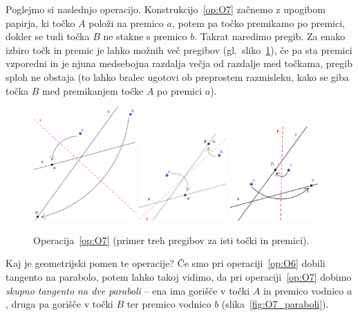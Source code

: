Poglejmo si naslednjo operacijo. Konstrukcijo~\ref{op:O7} začnemo z upogibom papirja, ki točko $A$ položi na premico $a$, potem pa točko premikamo po premici, dokler se tudi točka $B$ ne stakne s premico $b$. Takrat naredimo pregib. Za enako izbiro točk in premic je lahko možnih več pregibov (gl.\ sliko~\ref{fig:O7}), če pa sta premici vzporedni in je njuna medsebojna razdalja večja od razdalje med točkama, pregib sploh ne obstaja (to lahko bralec ugotovi ob preprostem razmisleku, kako se giba točka $B$ med premikanjem točke $A$ po premici $a$).

\begin{figure}[h]
    \centering
    \includegraphics[width=0.35\textwidth]{images/origami_operacije/O7b.png}
    \includegraphics[width=0.3\textwidth]{images/origami_operacije/O7a.png}
    \includegraphics[width=0.3\textwidth]{images/origami_operacije/O7c.png}
    \caption[Operacija~\ref{op:O7}]{Operacija~\ref{op:O7} (primer treh pregibov za isti točki in premici).}
    \label{fig:O7}
\end{figure}

Kaj je geometrijski pomen te operacije? Če smo pri operaciji~\ref{op:O6} dobili tangento na parabolo, potem lahko takoj vidimo, da pri operaciji~\ref{op:O7} dobimo \emph{skupno tangento na dve paraboli} -- ena ima gorišče v točki $A$ in premico vodnico $a$, druga pa gorišče v točki $B$ ter premico vodnico $b$ (slika~\ref{fig:O7_paraboli}).

